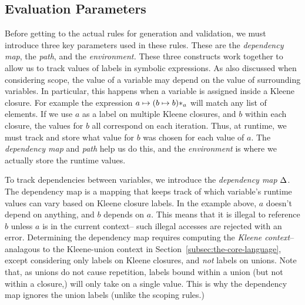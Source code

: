 \subsection{Evaluation Parameters}
\label{sec:mappings}
Before getting to the actual rules for generation and validation,
we must introduce three key parameters used in these rules.
These are the \textit{dependency map},
the \textit{path},
and the \textit{environment.}
These three constructs work together
to allow us to track values of labels in symbolic expressions.
As also discussed when considering scope,
the value of a variable may depend on the value of surrounding variables.
In particular, this happens when a variable is assigned inside a Kleene closure.
For example the expression $a \mapsto (b \mapsto b)*_{a}$ will match any list of elements. 
If we use $a$ as a label on multiple Kleene closures,
and $b$ within each closure,
the values for $b$ all correspond on each iteration.
Thus, at runtime, we must track and store what value for $b$ was chosen for each value of $a$.
The \textit{dependency map} and \textit{path}
help us do this,
and the \textit{environment} is where we actually store the runtime values.


To track dependencies between variables, we introduce the \textit{dependency map} $\Delta$. 
The dependency map is a mapping that keeps track of which variable's runtime values
can vary based on Kleene closure labels.
In the example above, $a$ doesn't depend on anything, and $b$ depends on $a$. 
This means that it is illegal to reference $b$ unless $a$ is in the current context--
such illegal accesses are rejected with an error.
Determining the dependency map requires computing
the \textit{Kleene context}--
analagous to the Kleene-union context in 
Section~\ref{subsec:the-core-language},
except considering only labels on Kleene closures, and \textit{not} labels on unions.
Note that, as unions do not cause
repetition,
labels bound within a union (but not within a closure,)
will only take on a single value.
This is why the dependency map ignores the union labels (unlike the scoping rules.)

